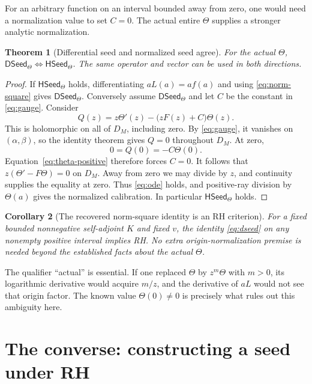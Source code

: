 \documentclass[11pt,a4paper]{article}
\numberwithin{equation}{section}
\newtheorem{theorem}{Theorem}[section]
\newtheorem{corollary}[theorem]{Corollary}
\theoremstyle{definition}
\theoremstyle{remark}
\newcommand{\HSeed}{\mathsf{HSeed}_{\Theta}}
\newcommand{\DSeed}{\mathsf{DSeed}_{\Theta}}
\begin{document}
For an arbitrary function on an interval bounded away from zero, one
would need a normalization value to set $C=0$. The actual entire
$\Theta$ supplies a stronger analytic normalization.

\begin{theorem}[Differential seed and normalized seed agree]\label{thm:normalization}
For the actual $\Theta$, $\DSeed\Longleftrightarrow\HSeed$.
The same operator and vector can be used in both directions.
\end{theorem}
\begin{proof}
If $\HSeed$ holds, differentiating $aL(a)=af(a)$ and using
\eqref{eq:norm-square} gives $\DSeed$.
Conversely assume $\DSeed$ and let $C$ be the constant in
\eqref{eq:gauge}. Consider
\begin{equation}\label{eq:Q}
Q(z)=z\Theta'(z)-\bigl(zF(z)+C\bigr)\Theta(z).
\end{equation}
This is holomorphic on all of $D_M$, including zero. By
\eqref{eq:gauge}, it vanishes on $(\alpha,\beta)$, so the identity
theorem gives $Q=0$ throughout $D_M$. At zero,
\[
0=Q(0)=-C\Theta(0).
\]
Equation~\eqref{eq:theta-positive} therefore forces $C=0$.
It follows that $z(\Theta'-F\Theta)=0$ on $D_M$. Away from zero
we may divide by $z$, and continuity supplies the equality at zero.
Thus \eqref{eq:ode} holds, and positive-ray division by $\Theta(a)$
gives the normalized calibration. In particular $\HSeed$ holds.
\end{proof}

\begin{corollary}[The recovered norm-square identity is an RH criterion]
For a fixed bounded nonnegative self-adjoint $K$ and fixed $v$,
the identity \eqref{eq:dseed} on any nonempty positive interval
implies RH. No extra origin-normalization premise is needed beyond
the established facts about the actual $\Theta$.
\end{corollary}

The qualifier ``actual'' is essential. If one replaced $\Theta$ by
$z^m\Theta$ with $m>0$, its logarithmic derivative would acquire
$m/z$, and the derivative of $aL$ would not see that origin factor.
The known value $\Theta(0)\ne0$ is precisely what rules out this
ambiguity here.

\section[Converse under RH]{The converse: constructing a seed under RH}\label{sec:converse}
\end{document}
